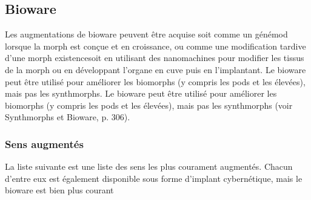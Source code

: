 \subsection{Bioware} \label{sec:bioware} 

Les augmentations de bioware peuvent être acquise soit comme un génémod lorsque la morph est conçue et en croissance, ou comme une modification tardive d'une morph existencesoit en utilisant des nanomachines pour modifier les tissus de la morph ou en développant l'organe en cuve puis en l'implantant. Le bioware peut être utilisé pour améliorer les biomorphs (y compris les pods et les élevées), mais pas les synthmorphs. Le bioware peut être utilisé pour améliorer les biomorphs (y compris les pods et les élevées), mais pas les synthmorphs (voir Synthmorphs et Bioware, p. 306). 

\subsubsection{Sens augmentés} 

La liste suivante est une liste des sens les plus courament augmentés. Chacun d'entre eux est également disponible sous forme d'implant cybernétique, mais le bioware est bien plus courant 

